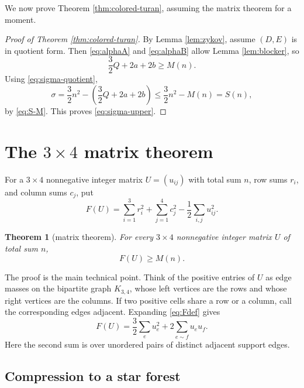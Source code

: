 \documentclass[12pt]{article}
\theoremstyle{plain}
\newtheorem{theorem}{Theorem}
\theoremstyle{definition}
\theoremstyle{remark}
\begin{document}
We now prove Theorem \ref{thm:colored-turan}, assuming the matrix theorem for a
moment.

\begin{proof}[Proof of Theorem \ref{thm:colored-turan}]
By Lemma \ref{lem:zykov}, assume \((D,E)\) is in quotient form.  Then
\eqref{eq:alphaA} and \eqref{eq:alphaB} allow Lemma \ref{lem:blocker}, so
\[
  \frac32Q+2a+2b\ge M(n).
\]
Using \eqref{eq:sigma-quotient},
\[
  \sigma
  =\frac32n^2-\left(\frac32Q+2a+2b\right)
  \le \frac32n^2-M(n)=S(n),
\]
by \eqref{eq:S-M}.  This proves \eqref{eq:sigma-upper}.
\end{proof}

\section{The \texorpdfstring{\(3\times4\)}{3 x 4} matrix theorem}\label{sec:matrix}

For a \(3\times4\) nonnegative integer matrix \(U=(u_{ij})\) with total sum
\(n\), row sums \(r_i\), and column sums \(c_j\), put
\begin{equation}\label{eq:Fdef}
  F(U)=\sum_{i=1}^3 r_i^2+
        \sum_{j=1}^4 c_j^2-\frac12\sum_{i,j}u_{ij}^2.
\end{equation}

\begin{theorem}[matrix theorem]\label{thm:matrix}
For every \(3\times4\) nonnegative integer matrix \(U\) of total sum \(n\),
\begin{equation}\label{eq:matrix-theorem}
  F(U)\ge M(n).
\end{equation}
\end{theorem}

The proof is the main technical point.  Think of the positive entries of
\(U\) as edge masses on the bipartite graph \(K_{3,4}\), whose left vertices
are the rows and whose right vertices are the columns.  If two positive cells
share a row or a column, call the corresponding edges adjacent.  Expanding
\eqref{eq:Fdef} gives
\begin{equation}\label{eq:F-edge}
  F(U)=\frac32\sum_e u_e^2+2\sum_{e\sim f}u_eu_f.
\end{equation}
Here the second sum is over unordered pairs of distinct adjacent support
edges.

\subsection*{Compression to a star forest}
\end{document}
